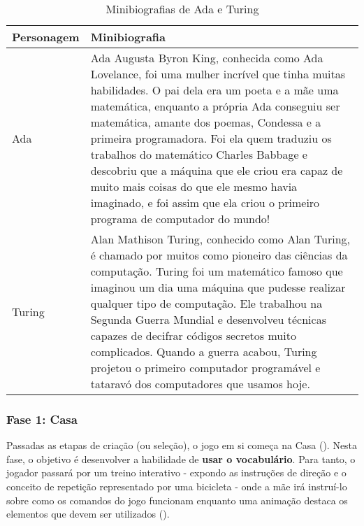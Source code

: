 \begin{table}[H]
\centering
\caption{Minibiografias de Ada e Turing}
\label{tab:minibiografias}
\begin{tabular}{|l|p{12cm}|}
\hline
\textbf{Personagem} & \textbf{Minibiografia}                                                                                                                                                                                                                                                                                                                                                                                                                                                                                                \\ \hline
Ada                 & Ada Augusta Byron King, conhecida como Ada Lovelance, foi uma mulher incrível que tinha muitas habilidades. O pai dela era um poeta e a mãe uma matemática, enquanto a própria Ada conseguiu ser matemática, amante dos poemas, Condessa e a primeira programadora. Foi ela quem traduziu os trabalhos do matemático Charles Babbage e descobriu que a máquina que ele criou era capaz de muito mais coisas do que ele mesmo havia imaginado, e foi assim que ela criou o primeiro programa de computador do mundo! \\ \hline
Turing              & Alan Mathison Turing, conhecido como Alan Turing, é chamado por muitos como pioneiro das ciências da computação. Turing foi um matemático famoso que imaginou um dia uma máquina que pudesse realizar qualquer tipo de computação. Ele trabalhou na Segunda Guerra Mundial e desenvolveu técnicas capazes de decifrar códigos secretos muito complicados. Quando a guerra acabou, Turing projetou o primeiro computador programável e tataravó dos computadores que usamos hoje.                                    \\ \hline
\end{tabular}
\end{table}

\subsubsection{Fase 1: Casa} \label{sssec:fase_1}

Passadas as etapas de criação (ou seleção), o jogo em si começa na Casa (). Nesta fase, o objetivo é desenvolver a habilidade de \textbf{usar o vocabulário}. Para tanto, o jogador passará por um treino interativo - expondo as instruções de direção e o conceito de repetição representado por uma bicicleta - onde a mãe irá instruí-lo sobre como os comandos do jogo funcionam enquanto uma animação destaca os elementos que devem ser utilizados (). 

